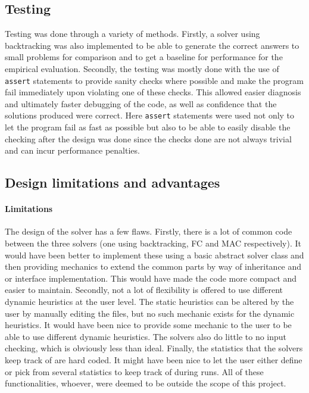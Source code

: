 \documentclass[british]{article}
\newcommand{\code}[1]{\texttt{#1}}
\begin{document}
	\subsection{Testing}
	Testing was done through a variety of methods. Firstly, a solver using backtracking was also implemented to be able to generate the correct answers to small problems for comparison and to get a baseline for performance for the empirical evaluation. Secondly, the testing was mostly done with the use of \code{assert} statements to provide sanity checks where possible and make the program fail immediately upon violating one of these checks. This allowed easier diagnosis and ultimately faster debugging of the code, as well as confidence that the solutions produced were correct. Here \code{assert} statements were used not only to let the program fail as fast as possible but also to be able to easily disable the checking after the design was done since the checks done are not always trivial and can incur performance penalties. 
	
	\subsection{Design limitations and advantages} 
	\paragraph{Limitations}The design of the solver has a few flaws. Firstly, there is a lot of common code between the three solvers (one using backtracking, FC and MAC respectively). It would have been better to implement these using a basic abstract solver class and then providing mechanics to extend the common parts by way of inheritance and or interface implementation. This would have made the code more compact and easier to maintain. Secondly, not a lot of flexibility is offered to use different dynamic heuristics at the user level. The static heuristics can be altered by the user by manually editing the files, but no such mechanic exists for the dynamic heuristics. It would have been nice to provide some mechanic to the user to be able to use different dynamic heuristics. The solvers also do little to no input checking, which is obviously less than ideal. Finally, the statistics that the solvers keep track of are hard coded. It might have been nice to let the user either define or pick from several statistics to keep track of during runs. All of these functionalities, whoever, were deemed to be outside the scope of this project. 
	
\end{document}
